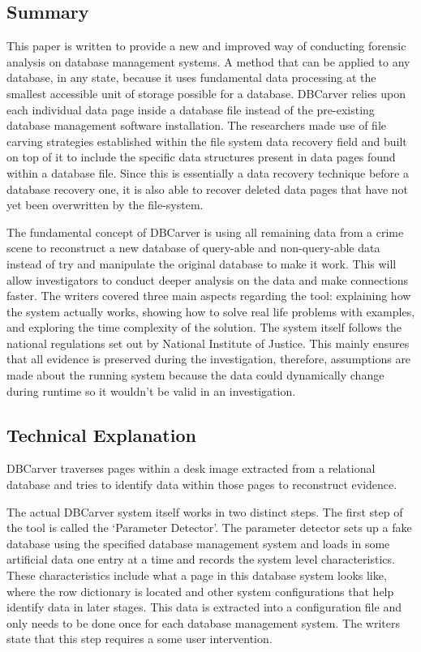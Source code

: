 \documentclass[11pt,]{article}
\begin{document}
\hypertarget{summary}{%
\subsection{Summary}\label{summary}}

This paper is written to provide a new and improved way of conducting
forensic analysis on database management systems. A method that can be
applied to any database, in any state, because it uses fundamental data
processing at the smallest accessible unit of storage possible for a
database. DBCarver relies upon each individual data page inside a
database file instead of the pre-existing database management software
installation. The researchers made use of file carving strategies
established within the file system data recovery field and built on top
of it to include the specific data structures present in data pages
found within a database file. Since this is essentially a data recovery
technique before a database recovery one, it is also able to recover
deleted data pages that have not yet been overwritten by the
file-system.

The fundamental concept of DBCarver is using all remaining data from a
crime scene to reconstruct a new database of query-able and
non-query-able data instead of try and manipulate the original database
to make it work. This will allow investigators to conduct deeper
analysis on the data and make connections faster. The writers covered
three main aspects regarding the tool: explaining how the system
actually works, showing how to solve real life problems with examples,
and exploring the time complexity of the solution. The system itself
follows the national regulations set out by National Institute of
Justice. This mainly ensures that all evidence is preserved during the
investigation, therefore, assumptions are made about the running system
because the data could dynamically change during runtime so it wouldn't
be valid in an investigation.

\hypertarget{technical-explanation}{%
\subsection{Technical Explanation}\label{technical-explanation}}

DBCarver traverses pages within a desk image extracted from a relational
database and tries to identify data within those pages to reconstruct
evidence.

The actual DBCarver system itself works in two distinct steps. The first
step of the tool is called the `Parameter Detector'. The parameter
detector sets up a fake database using the specified database management
system and loads in some artificial data one entry at a time and records
the system level characteristics. These characteristics include what a
page in this database system looks like, where the row dictionary is
located and other system configurations that help identify data in later
stages. This data is extracted into a configuration file and only needs
to be done once for each database management system. The writers state
that this step requires a some user intervention.
\end{document}
